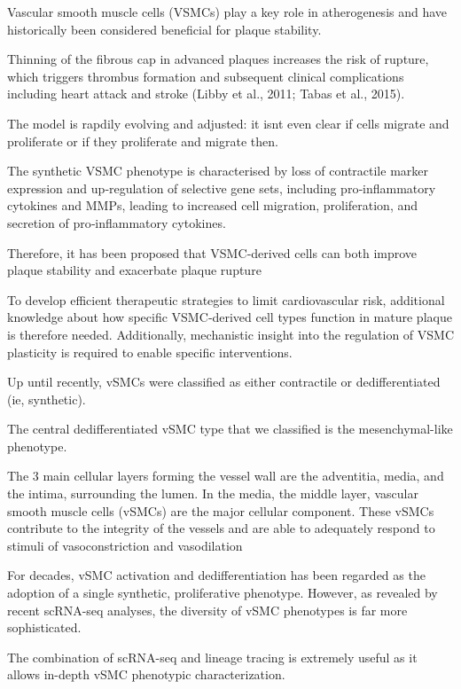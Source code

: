 Vascular smooth muscle cells (VSMCs) play a key role in atherogenesis and have historically been considered beneficial for plaque stability.

Thinning of the fibrous cap in advanced plaques increases the risk of rupture, which triggers thrombus formation and subsequent clinical complications including heart attack and stroke (Libby et al., 2011; Tabas et al., 2015).

The model is rapdily evolving and adjusted: it isnt even clear if cells migrate and proliferate or if they proliferate and migrate then.

The synthetic VSMC phenotype is characterised by loss of contractile marker expression and up‐regulation of selective gene sets, including pro‐inflammatory cytokines and MMPs, leading to increased cell migration, proliferation, and secretion of pro‐inflammatory cytokines.

Therefore, it has been proposed that VSMC‐derived cells can both improve plaque stability and exacerbate plaque rupture

To develop efficient therapeutic strategies to limit cardiovascular risk, additional knowledge about how specific VSMC‐derived cell types function in mature plaque is therefore needed. Additionally, mechanistic insight into the regulation of VSMC plasticity is required to enable specific interventions.
\cite{harmanRoleSmoothMuscle2019}

Up until recently, vSMCs were classified as either contractile or dedifferentiated (ie, synthetic).

The central dedifferentiated vSMC type that we classified is the mesenchymal-like phenotype.

The 3 main cellular layers forming the vessel wall are the adventitia, media, and the intima, surrounding the lumen. In the media, the middle layer, vascular smooth muscle cells (vSMCs) are the major cellular component. These vSMCs contribute to the integrity of the vessels and are able to adequately respond to stimuli of vasoconstriction and vasodilation

For decades, vSMC activation and dedifferentiation has been regarded as the adoption of a single synthetic, proliferative phenotype. However, as revealed by recent scRNA-seq analyses, the diversity of vSMC phenotypes is far more sophisticated.

The combination of scRNA-seq and lineage tracing is extremely useful as it allows in-depth vSMC phenotypic characterization.

